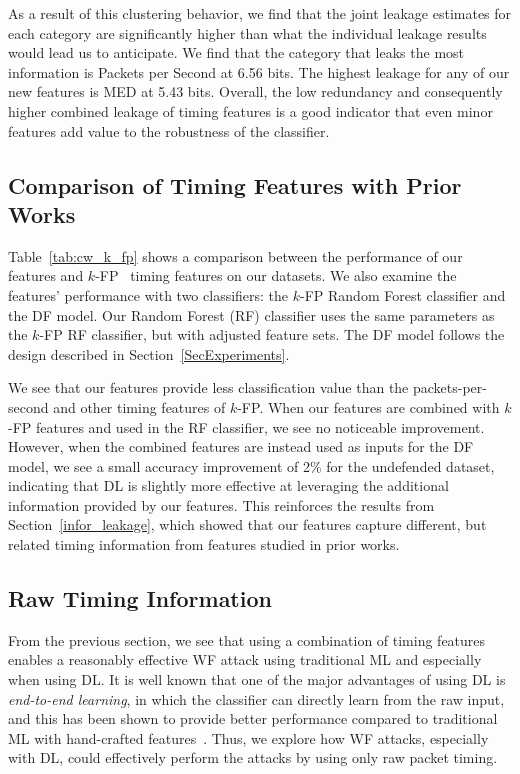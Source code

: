 \documentclass[USenglish,oneside,twocolumn]{article}
\begin{document}
 
As a result of this clustering behavior, we find that the joint leakage estimates for each category are significantly higher than what the individual leakage results would lead us to anticipate. We find that the category that leaks the most information is Packets per Second at 6.56 bits. The highest leakage for any of our new features is MED at 5.43 bits. Overall, the low redundancy and consequently higher combined leakage of timing features is a good indicator that even minor features add value to the robustness of the classifier.



\subsection{Comparison of Timing Features with Prior Works}
\label{k_fp_feats_our_feats_compare}
Table~\ref{tab:cw_k_fp} shows a comparison between the performance of our features and $k$-FP~\cite{hayes2016k} timing features on our datasets. We also examine the features' performance with two classifiers: the $k$-FP Random Forest classifier and the DF model. Our Random Forest (RF) classifier uses the same parameters as the $k$-FP RF classifier, but with adjusted feature sets. The DF model follows the design described in Section~\ref{SecExperiments}.

We see that our features provide less classification value than the packets-per-second and other timing features of $k$-FP. 
When our features are combined with $k$-FP features and used in the RF classifier, we see no noticeable improvement. However, when the combined features are instead used as inputs for the DF model, we see a small accuracy improvement of 2\% for the undefended dataset, indicating that DL is slightly more effective at leveraging the additional information provided by our features. This reinforces the results from Section~\ref{infor_leakage}, which showed that our features capture different, but related timing information from features studied in prior works.




\subsection{Raw Timing Information}
\label{rawtimingexps}


From the previous section, we see that using a combination of timing features enables  a reasonably effective WF attack using traditional ML and especially when using DL. It is well known that one of the major advantages of using DL is \textit{end-to-end learning}, in which the classifier can directly learn from the raw input, and this has been shown to provide better performance compared to traditional ML with hand-crafted features~\cite{Song2015end}. Thus, we explore how WF attacks, especially with DL, could effectively perform the attacks by using only raw packet timing. 
\end{document}
